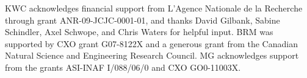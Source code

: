 \documentclass[11pt, preprint]{aastex}
\begin{document}
\acknowledgements

KWC acknowledges financial support from L'Agence Nationale de la
Recherche through grant ANR-09-JCJC-0001-01, and thanks David Gilbank,
Sabine Schindler, Axel Schwope, and Chris Waters for helpful
input. BRM was supported by CXO grant G07-8122X and a generous grant
from the Canadian Natural Science and Engineering Research Council. MG
acknowledges support from the grants ASI-INAF I/088/06/0 and CXO
GO0-11003X.





\clearpage






\end{document}

